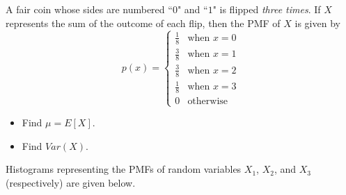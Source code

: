 \documentclass[10pt]{article}
\begin{document}
\exercise{} A fair coin whose sides are numbered ``$0$" and ``$1$" is flipped {\it three times}. If $X$ represents the sum of the outcome of each flip, then the PMF of $X$ is given by
\[ p(x)=\begin{cases}
\frac18 & \text{when }x=0\\
\frac38 & \text{when }x=1\\
\frac38 & \text{when }x=2\\
\frac18 & \text{when }x=3\\
0 & \text{otherwise}
\end{cases}\]

\begin{itemize}
    \item[(a)] Find $\mu=E[X]$.
        \vfill
        \vfill
    \item[(b)] Find $Var(X)$.
        \vfill
        \vfill
\end{itemize}

\newpage%

\exercise{} Histograms representing the PMFs of random variables $X_1$, $X_2$, and $X_3$ (respectively) are given below.
\end{document}
